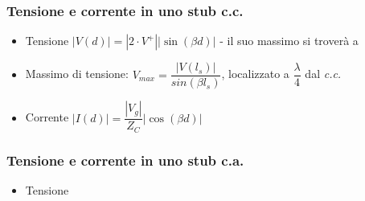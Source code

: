 \documentclass{article}
\begin{document}
\subsubsection{Tensione e corrente in uno stub c.c.}
\begin{itemize}
		\item Tensione \( |V(d)| = |2 \cdot V^+ | \left| \sin(\beta d) \right| \) - il suo massimo si troverà a
		\item Massimo di tensione: \( V_{max} = \dfrac{|V(l_s)|}{sin(\beta l_s)} \), localizzato a \( \dfrac{\lambda}{4} \) dal \textit{c.c.}
		\item Corrente \( |I(d)| = \dfrac{|V_g|}{Z_C} |\cos (\beta d) |\)
\end{itemize}

\subsubsection{Tensione e corrente in uno stub c.a.}
\begin{itemize}
	\item Tensione
\end{itemize}	
\end{document}
